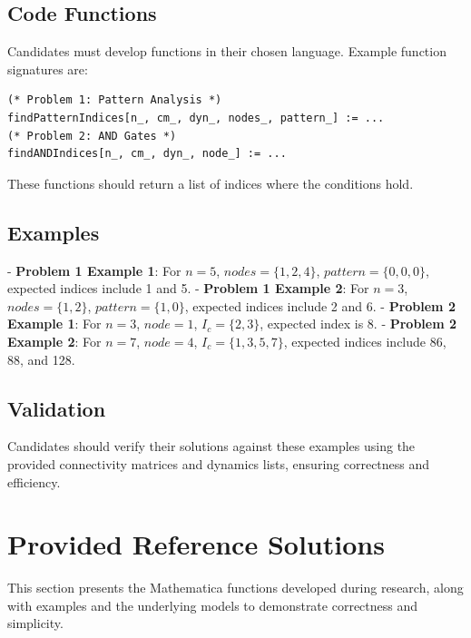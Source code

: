 \documentclass[12pt]{article}
\begin{document}
\subsection{Code Functions}
Candidates must develop functions in their chosen language. Example function signatures are:
\begin{lstlisting}[caption={Example Function Signatures}]
(* Problem 1: Pattern Analysis *)
findPatternIndices[n_, cm_, dyn_, nodes_, pattern_] := ...
(* Problem 2: AND Gates *)
findANDIndices[n_, cm_, dyn_, node_] := ...
\end{lstlisting}

These functions should return a list of indices where the conditions hold.

\subsection{Examples}
- \textbf{Problem 1 Example 1}: For \( n = 5 \), \( nodes = \{1, 2, 4\} \), \( pattern = \{0, 0, 0\} \), expected indices include 1 and 5.
- \textbf{Problem 1 Example 2}: For \( n = 3 \), \( nodes = \{1, 2\} \), \( pattern = \{1, 0\} \), expected indices include 2 and 6.
- \textbf{Problem 2 Example 1}: For \( n = 3 \), \( node = 1 \), \( I_c = \{2, 3\} \), expected index is 8.
- \textbf{Problem 2 Example 2}: For \( n = 7 \), \( node = 4 \), \( I_c = \{1, 3, 5, 7\} \), expected indices include 86, 88, and 128.

\subsection{Validation}
Candidates should verify their solutions against these examples using the provided connectivity matrices and dynamics lists, ensuring correctness and efficiency.

\section{Provided Reference Solutions}
This section presents the Mathematica functions developed during research, along with examples and the underlying models to demonstrate correctness and simplicity.
\end{document}
